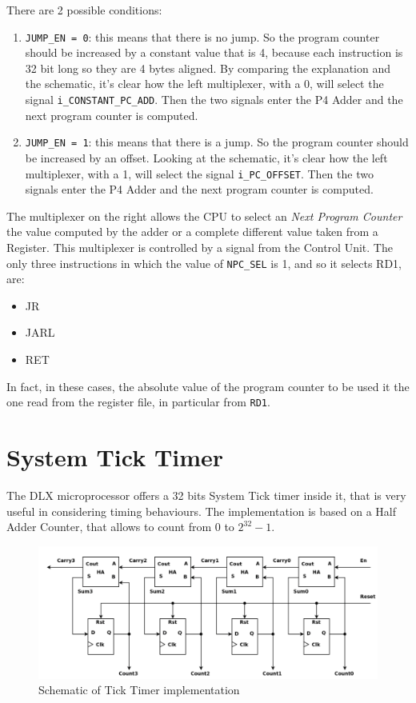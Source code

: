 There are 2 possible conditions:

\begin{enumerate}
  \item \texttt{JUMP\_EN = 0}: this means that there is no jump. So the program counter should be increased by a constant value that is 4, because each instruction is 32 bit long so they are 4 bytes aligned. By comparing the explanation and the schematic, it's clear how the left multiplexer, with a 0, will select the signal \texttt{i\_CONSTANT\_PC\_ADD}. Then the two signals enter the P4 Adder and the next program counter is computed.  
  \item \texttt{JUMP\_EN = 1}: this means that there is a jump. So the program counter should be increased by an offset. Looking at the schematic, it's clear how the left multiplexer, with a 1, will select the signal \texttt{i\_PC\_OFFSET}. Then the two signals enter the P4 Adder and the next program counter is computed. 
\end{enumerate}

The multiplexer on the right allows the CPU to select an \emph{Next Program Counter} the value computed by the adder or a complete different value taken from  a Register. This multiplexer is controlled by a signal from the Control Unit. The only three instructions in which the value of \texttt{NPC\_SEL} is 1, and so it selects RD1, are:

\begin{itemize}
  \item JR
  \item JARL
  \item RET
\end{itemize}

In fact, in these cases, the absolute value of the program counter to be used it the one read from the register file, in particular from \texttt{RD1}.

\newpage
\section{System Tick Timer}

The DLX microprocessor offers a 32 bits System Tick timer inside it, that is very useful in considering timing behaviours. The implementation is based on a Half Adder Counter, that allows to count from 0 to $2^{32} - 1$.

\begin{figure}[H]
	\centering
	\includegraphics[width=1.0\textwidth]{chapters/4_DecodeStage/images/ha_counter.png}
	\caption{Schematic of Tick Timer implementation}
	\label{ticktmr_hacounter}
\end{figure}

